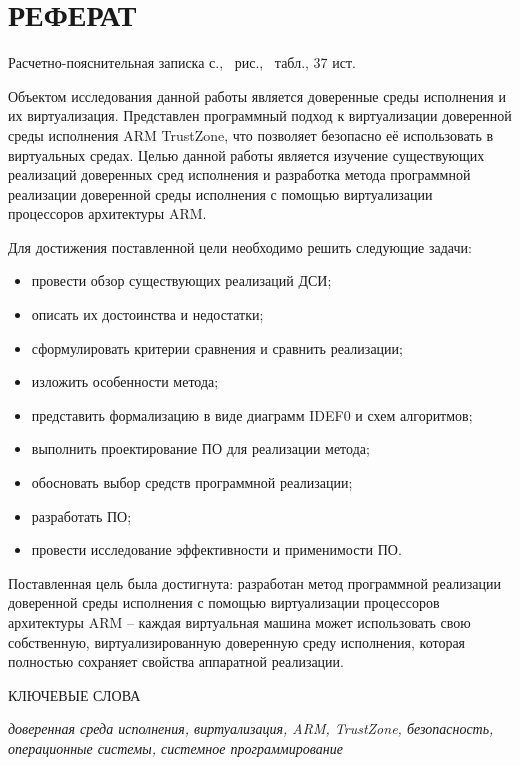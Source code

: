 \section*{РЕФЕРАТ}

Расчетно-пояснительная записка \pageref{LastPage} с., \totalfigures\ рис., \totaltables\ табл., 37 ист.

Объектом исследования данной работы является доверенные среды исполнения и их виртуализация. Представлен программный подход к виртуализации доверенной среды исполнения ARM TrustZone, что позволяет безопасно её использовать в виртуальных средах. Целью данной работы является изучение существующих реализаций доверенных сред исполнения и разработка метода программной реализации доверенной среды исполнения с помощью виртуализации процессоров архитектуры ARM.

Для достижения поставленной цели необходимо решить следующие задачи:

\begin{itemize}
	\item провести обзор существующих реализаций ДСИ;
	\item описать их достоинства и недостатки;
	\item сформулировать критерии сравнения и сравнить реализации;
	\item изложить особенности метода;
	\item представить формализацию в виде диаграмм IDEF0 и схем алгоритмов;
	\item выполнить проектирование ПО для реализации метода;
	\item обосновать выбор средств программной реализации;
	\item разработать ПО;
	\item провести исследование эффективности и применимости ПО.
\end{itemize}

Поставленная цель была достигнута: разработан метод программной реализации доверенной среды исполнения с помощью виртуализации процессоров архитектуры ARM -- каждая виртуальная машина может использовать свою собственную, виртуализированную доверенную среду исполнения, которая полностью сохраняет свойства аппаратной реализации.

КЛЮЧЕВЫЕ СЛОВА

\textit{доверенная среда исполнения, виртуализация, ARM, TrustZone, безопасность, операционные системы, системное программирование}

\pagebreak
